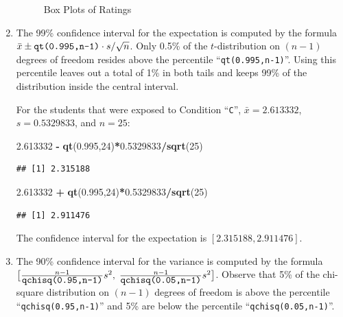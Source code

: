 \documentclass[
]{krantz}
\makeatletter
\newenvironment{Shaded}{\begin{snugshade}}{\end{snugshade}}
\newcommand{\DecValTok}[1]{\textcolor[rgb]{0.00,0.00,0.81}{#1}}
\newcommand{\FloatTok}[1]{\textcolor[rgb]{0.00,0.00,0.81}{#1}}
\newcommand{\KeywordTok}[1]{\textcolor[rgb]{0.13,0.29,0.53}{\textbf{#1}}}
\newcommand{\NormalTok}[1]{#1}
\newcommand{\OperatorTok}[1]{\textcolor[rgb]{0.81,0.36,0.00}{\textbf{#1}}}
\newcommand{\StringTok}[1]{\textcolor[rgb]{0.31,0.60,0.02}{#1}}
\newenvironment{kframe}{%
\medskip{}
\setlength{\fboxsep}{.8em}
 \def\at@end@of@kframe{}%
 \ifinner\ifhmode%
  \def\at@end@of@kframe{\end{minipage}}%
  \begin{minipage}{\columnwidth}%
 \fi\fi%
 \def\FrameCommand##1{\hskip\@totalleftmargin \hskip-\fboxsep
 \colorbox{shadecolor}{##1}\hskip-\fboxsep
     \hskip-\linewidth \hskip-\@totalleftmargin \hskip\columnwidth}%
 \MakeFramed {\advance\hsize-\width
   \@totalleftmargin\z@ \linewidth\hsize
   \@setminipage}}%
 {\par\unskip\endMakeFramed%
 \at@end@of@kframe}
\renewenvironment{Shaded}{\begin{kframe}}{\end{kframe}}
\theoremstyle{definition}
\theoremstyle{definition}
\theoremstyle{definition}
\theoremstyle{remark}
\makeatother
\begin{document}
\begin{enumerate}
\begin{figure}
{   }

   \caption{Box Plots of Ratings}\label{fig:Confidence2}
   \end{figure}
\item
  The 99\% confidence interval for
  the expectation is computed by the formula
  \(\bar x \pm \mbox{\texttt{qt(0.995,n-1)}} \cdot s/\sqrt{n}\). Only 0.5\%
  of the \(t\)-distribution on \((n-1)\) degrees of freedom resides above the
  percentile ``\texttt{qt(0.995,n-1)}''. Using this percentile leaves out a total
  of 1\% in both tails and keeps 99\% of the distribution inside the central
  interval.

  For the students that were exposed to Condition ``\texttt{C}'',
  \(\bar x = 2.613332\), \(s = 0.5329833\), and \(n = 25\):

\begin{Shaded}
\begin{Highlighting}[]
\FloatTok{2.613332} \OperatorTok{-}\StringTok{ }\KeywordTok{qt}\NormalTok{(}\FloatTok{0.995}\NormalTok{,}\DecValTok{24}\NormalTok{)}\OperatorTok{*}\FloatTok{0.5329833}\OperatorTok{/}\KeywordTok{sqrt}\NormalTok{(}\DecValTok{25}\NormalTok{)}
\end{Highlighting}
\end{Shaded}

\begin{verbatim}
## [1] 2.315188
\end{verbatim}

\begin{Shaded}
\begin{Highlighting}[]
\FloatTok{2.613332} \OperatorTok{+}\StringTok{ }\KeywordTok{qt}\NormalTok{(}\FloatTok{0.995}\NormalTok{,}\DecValTok{24}\NormalTok{)}\OperatorTok{*}\FloatTok{0.5329833}\OperatorTok{/}\KeywordTok{sqrt}\NormalTok{(}\DecValTok{25}\NormalTok{)}
\end{Highlighting}
\end{Shaded}

\begin{verbatim}
## [1] 2.911476
\end{verbatim}

  The confidence interval for the expectation is \([2.315188, 2.911476]\).
\item
  The 90\% confidence interval for
  the variance is computed by the formula
  \(\big[\frac{n-1}{\mbox{\texttt{qchisq(0.95,n-1)}}} s^2 ,\;\frac{n-1}{\mbox{\texttt{qchisq(0.05,n-1)}}} s^2\big]\).
  Observe that 5\% of the chi-square distribution on \((n-1)\) degrees of
  freedom is above the percentile ``\texttt{qchisq(0.95,n-1)}'' and 5\% are below
  the percentile ``\texttt{qchisq(0.05,n-1)}''.


\end{enumerate}
\end{document}

